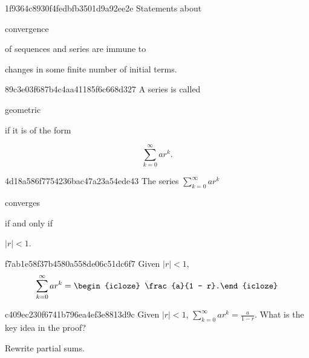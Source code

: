 \begin{note}{1f9364c8930f4fedbfb3501d9a92ee2e}
    Statements about \begin{icloze}{2}convergence\end{icloze} of sequences and series are immune to \begin{icloze}{1}changes in some finite number of initial terms.\end{icloze}
\end{note}

\begin{note}{89c3e03f687b4c4aa41185f6c668d327}
    A series is called \begin{icloze}{2}geometric\end{icloze} if it is of the form
    \begin{icloze}{1}
        \[
            \sum_{k=0}^{\infty} ar^{k}.
        \]
    \end{icloze}
\end{note}

\begin{note}{4d18a586f7754236bac47a23a54ede43}
    The series \({ \sum_{k=0}^{\infty} ar^{k} }\) \begin{icloze}{2}converges\end{icloze} \begin{icloze}{3}if and only if\end{icloze} \begin{icloze}{1}\({ \left\lvert r \right\rvert < 1 }\).\end{icloze}
\end{note}

\begin{note}{f7ab1e58f37b4580a558de06c51dc6f7}
    Given \({ \left\lvert r \right\rvert < 1 }\),
    \[
        \sum_{k=0}^{\infty} ar^{k} = \begin{icloze}{1}\frac{a}{1 - r}.\end{icloze}
    \]
\end{note}

\begin{note}{c409ec230f6741b796ea4ef3e8813d9c}
    Given \({ \left\lvert r \right\rvert < 1 }\), \({ \sum_{k=0}^{\infty} ar^{k} = \frac{a}{1 - r} }\).
    What is the key idea in the proof?

    \begin{cloze}{1}
        Rewrite partial sums.
    \end{cloze}
\end{note}


